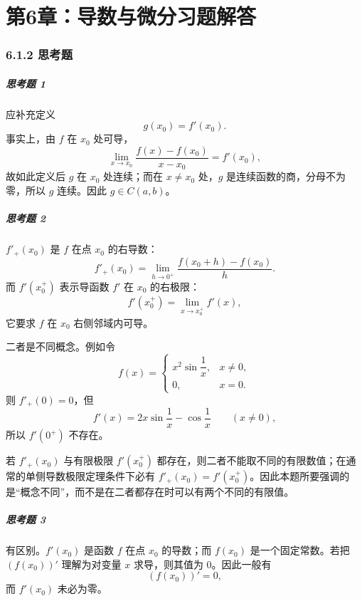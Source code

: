 
\chapter*{第6章：导数与微分习题解答}
\subsection*{6.1.2 思考题}

\paragraph{思考题 1}
\begin{xsolution}
应补充定义
\[
  g(x_0)=f'(x_0).
\]
事实上，由 $f$ 在 $x_0$ 处可导，
\[
  \lim_{x\to x_0}\frac{f(x)-f(x_0)}{x-x_0}=f'(x_0),
\]
故如此定义后 $g$ 在 $x_0$ 处连续；而在 $x\ne x_0$ 处，$g$ 是连续函数的商，分母不为零，所以 $g$ 连续。因此 $g\in C(a,b)$。
\end{xsolution}

\paragraph{思考题 2}
\begin{xsolution}
$f'_+(x_0)$ 是 $f$ 在点 $x_0$ 的右导数：
\[
  f'_+(x_0)=\lim_{h\to0^+}\frac{f(x_0+h)-f(x_0)}h.
\]
而 $f'(x_0^+)$ 表示导函数 $f'$ 在 $x_0$ 的右极限：
\[
  f'(x_0^+)=\lim_{x\to x_0^+}f'(x),
\]
它要求 $f$ 在 $x_0$ 右侧邻域内可导。

二者是不同概念。例如令
\[
  f(x)=
  \begin{cases}
    x^2\sin\dfrac1x,&x\ne0,\\
    0,&x=0.
  \end{cases}
\]
则 $f'_+(0)=0$，但
\[
  f'(x)=2x\sin\frac1x-\cos\frac1x\qquad(x\ne0),
\]
所以 $f'(0^+)$ 不存在。

若 $f'_+(x_0)$ 与有限极限 $f'(x_0^+)$ 都存在，则二者不能取不同的有限数值；在通常的单侧导数极限定理条件下必有 $f'_+(x_0)=f'(x_0^+)$。因此本题所要强调的是“概念不同”，而不是在二者都存在时可以有两个不同的有限值。
\end{xsolution}

\paragraph{思考题 3}
\begin{xsolution}
有区别。$f'(x_0)$ 是函数 $f$ 在点 $x_0$ 的导数；而 $f(x_0)$ 是一个固定常数。若把 $(f(x_0))'$ 理解为对变量 $x$ 求导，则其值为 $0$。因此一般有
\[
  (f(x_0))'=0,
\]
而 $f'(x_0)$ 未必为零。
\end{xsolution}

